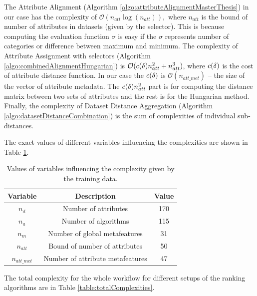  The Attribute Alignment (Algorithm \ref{algo:attributeAlignmentMasterThesis}) in our case has the complexity of $\mathcal{O}(n_{att}\log(n_{att})),$ where $n_{att}$ is the bound of number of attributes in datasets (given by the selector). This is because computing the evaluation function $\sigma$ is easy if the $\sigma$ represents number of categories or difference between maximum and minimum. The complexity of Attribute Assignment with selectors (Algorithm \ref{algo:combinedAlignmentHungarian}) is $\mathcal{O}(c(\delta)n_{att}^2+ n_{att}^3)$, where $c(\delta)$ is the cost of attribute distance function. In our case the $c(\delta)$ is $\mathcal{O}(n_{att\_met})$ -- the size of the vector of attribute metadata. The $c(\delta)n_{att}^2$ part is for computing the distance matrix between two sets of attributes and the rest is for the Hungarian method. Finally, the complexity of Dataset Distance Aggregation (Algorithm \ref{algo:datasetDistanceCombination}) is the sum of complexities of individual sub-distances.
 
 The exact values of different variables influencing the complexities are shown in Table \ref{table:complexityVariablesValues}. 
 \begin{table}[htbp]
 	\caption{Values of variables influencing the complexity given by the training data.}
 	\label{table:complexityVariablesValues}
 	\centering
 	\begin{tabular}{ |c | c | c | }
 		\hline
 		Variable & Description & Value \\
 		\hline                       
 		$n_d$ & Number of attributes &  170\\
 		$n_a$ & Number of algorithms &  115 \\
 		$n_m$ & Number of global metafeatures &  31 \\
 		$n_{att}$ & Bound of number of attributes& 50   \\
 		$n_{att\_met}$ & Number of attribute metafeatures & 47    \\
 		\hline  
 	\end{tabular}
 \end{table} 
 
 The total complexity for the whole workflow for different setups of the ranking algorithms are in Table \ref{table:totalComplexities}.
 
